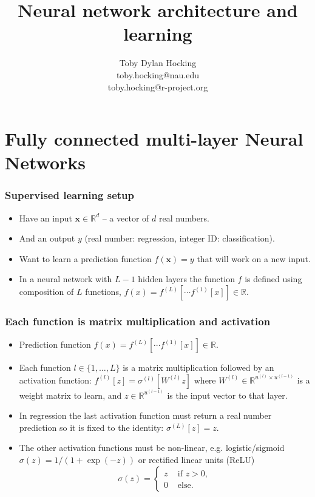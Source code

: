 \documentclass{beamer}
\begin{document}
\title{Neural network architecture and learning}

\author{
  Toby Dylan Hocking\\
  toby.hocking@nau.edu\\
  toby.hocking@r-project.org\\
}

\maketitle


\section{Fully connected multi-layer Neural Networks}

\begin{frame}
  \frametitle{Supervised learning setup}
  \begin{itemize}
  \item Have an input $\mathbf x\in\mathbb R^d$ -- a vector of $d$
    real numbers.
  \item And an output $y$ (real number: regression, integer ID:
    classification).
  \item Want to learn a prediction function $f(\mathbf x) = y$ that
    will work on a new input.
  \item In a neural network with $L-1$ hidden layers the function $f$
    is defined using composition of $L$ functions,
    $f(x)=f^{(L)}[\cdots f^{(1)}[x] ]\in\mathbb R$.
  \end{itemize}
\end{frame}

\begin{frame}
  \frametitle{Each function is matrix multiplication and activation}
  \begin{itemize}
  \item Prediction function $f(x)=f^{(L)}[\cdots f^{(1)}[x] ]\in\mathbb R$.
  \item Each function $l\in\{1,\dots, L\}$ is a matrix multiplication
    followed by an activation function:
    $f^{(l)}[z] = \sigma^{(l)}[ W^{(l)} z ]$ where
    $W^{(l)}\in\mathbb R^{u^{(l)}\times u^{(l-1)}}$ is a weight matrix
    to learn, and $z\in\mathbb R^{u^{(l-1)}}$ is the input vector to
    that layer.
\item In regression the last activation function must return
a real number prediction so it is fixed to the identity:
$\sigma^{(L)}[z]=z$.
\item The other activation functions must be
non-linear, e.g. 
logistic/sigmoid $\sigma(z)=1/(1+\exp(-z))$ or rectified linear units (ReLU) 
$$
\sigma(z)=
\begin{cases}
  z & \text{ if } z>0,\\
  0 & \text{ else.}
\end{cases}
$$ 
\end{itemize}
\end{frame}
\end{document}
